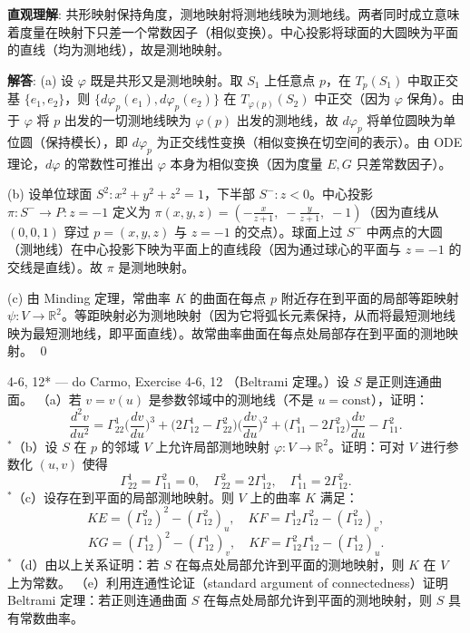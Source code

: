 \begin{solution}
\textbf{直观理解}: 共形映射保持角度，测地映射将测地线映为测地线。两者同时成立意味着度量在映射下只差一个常数因子（相似变换）。中心投影将球面的大圆映为平面的直线（均为测地线），故是测地映射。

\textbf{解答}: (a) 设 $\varphi$ 既是共形又是测地映射。取 $S_1$ 上任意点 $p$，在 $T_p(S_1)$ 中取正交基 $\{e_1,e_2\}$，则 $\{d\varphi_p(e_1), d\varphi_p(e_2)\}$ 在 $T_{\varphi(p)}(S_2)$ 中正交（因为 $\varphi$ 保角）。由于 $\varphi$ 将 $p$ 出发的一切测地线映为 $\varphi(p)$ 出发的测地线，故 $d\varphi_p$ 将单位圆映为单位圆（保持模长），即 $d\varphi_p$ 为正交线性变换（相似变换在切空间的表示）。由 ODE 理论，$d\varphi$ 的常数性可推出 $\varphi$ 本身为相似变换（因为度量 $E,G$ 只差常数因子）。

(b) 设单位球面 $S^2: x^2+y^2+z^2=1$，下半部 $S^-: z<0$。中心投影 $\pi: S^- \to P: z=-1$ 定义为 $\pi(x,y,z) = (-\frac{x}{z+1},\; -\frac{y}{z+1},\; -1)$（因为直线从 $(0,0,1)$ 穿过 $p=(x,y,z)$ 与 $z=-1$ 的交点）。球面上过 $S^-$ 中两点的大圆（测地线）在中心投影下映为平面上的直线段（因为通过球心的平面与 $z=-1$ 的交线是直线）。故 $\pi$ 是测地映射。

(c) 由 Minding 定理，常曲率 $K$ 的曲面在每点 $p$ 附近存在到平面的局部等距映射 $\psi: V \to \mathbb{R}^2$。等距映射必为测地映射（因为它将弧长元素保持，从而将最短测地线映为最短测地线，即平面直线）。故常曲率曲面在每点处局部存在到平面的测地映射。
\qed
\end{solution}

\begin{exercise}{4-6, 12* — do Carmo, Exercise 4-6, 12}
（Beltrami 定理。）设 $S$ 是正则连通曲面。
（a）若 $v=v(u)$ 是参数邻域中的测地线（不是 $u=\mathrm{const}$），证明：
\[
\frac{d^2 v}{du^2} = \Gamma_{22}^1\Big(\frac{dv}{du}\Big)^3 + \Big(2\Gamma_{12}^1 - \Gamma_{22}^2\Big)\Big(\frac{dv}{du}\Big)^2 + \Big(\Gamma_{11}^1 - 2\Gamma_{12}^2\Big)\frac{dv}{du} - \Gamma_{11}^2.
\]$^{*}$（b）设 $S$ 在 $p$ 的邻域 $V$ 上允许局部测地映射 $\varphi: V \to \mathbb{R}^2$。证明：可对 $V$ 进行参数化 $(u,v)$ 使得
\[
\Gamma_{22}^1 = \Gamma_{11}^2 = 0,\quad \Gamma_{22}^2 = 2\Gamma_{12}^1,\quad \Gamma_{11}^1 = 2\Gamma_{12}^2.
\]$^{*}$（c）设存在到平面的局部测地映射。则 $V$ 上的曲率 $K$ 满足：
\[
KE = (\Gamma_{12}^2)^2 - (\Gamma_{12}^2)_u,\quad
KF = \Gamma_{12}^1\Gamma_{12}^2 - (\Gamma_{12}^2)_v,
\tag*{(a)(b)}
\]
\[
KG = (\Gamma_{12}^1)^2 - (\Gamma_{12}^1)_v,\quad
KF = \Gamma_{12}^2\Gamma_{12}^1 - (\Gamma_{12}^1)_u.
\tag*{(c)(d)}
\]$^{*}$（d）由以上关系证明：若 $S$ 在每点处局部允许到平面的测地映射，则 $K$ 在 $V$ 上为常数。
（e）利用连通性论证（standard argument of connectedness）证明 Beltrami 定理：若正则连通曲面 $S$ 在每点处局部允许到平面的测地映射，则 $S$ 具有常数曲率。
\end{exercise}

